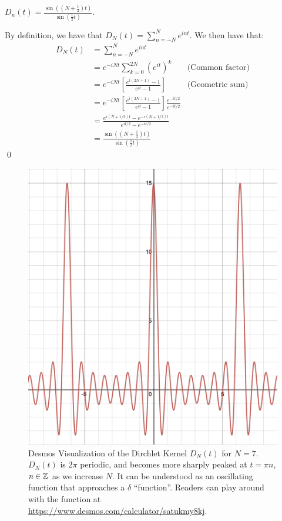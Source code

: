 \begin{nlemma}{ 1}{}
    $D_n(t) = \frac{\sin((N + \frac{1}{2})t)}{\sin(\frac{1}{2}t)}$.
\end{nlemma}

\begin{nproof}
    By definition, we have that $D_N(t) = \sum_{n=-N}^N e^{int}$. We then have that:
    \begin{align*}
        D_N(t) &= \sum_{n=-N}^N e^{int}
        \\ &= e^{-iNt}\sum_{k=0}^{2N}(e^{it})^k & \text{(Common factor)}
        \\ &= e^{-iNt}\left[\frac{e^{i(2N+1)} - 1}{e^{it} - 1}\right] & \text{(Geometric sum)}
        \\ &= e^{-iNt}\left[\frac{e^{i(2N+1)} - 1}{e^{it} - 1}\right]\frac{e^{-it/2}}{e^{-it/2}}
        \\ &= \frac{e^{i(N+1/2)t} - e^{-i(N+1/2)t}}{e^{it/2} - e^{-it/2}}
        \\ &= \frac{\sin((N + \frac{1}{2})t)}{\sin(\frac{1}{2}t)}
    \end{align*} \qed
\end{nproof}

\begin{figure}[htbp]
    \centering
    \includegraphics[scale=0.3]{Images/Dirchlet-graph.png}
    
    \caption{Desmos Visualization of the Dirchlet Kernel $D_N(t)$ for $N = 7$. $D_N(t)$ is $2\pi$ periodic, and becomes more sharply peaked at $t = \pi n$, $n \in \mathbb{Z}$ as we increase $N$. It can be understood as an oscillating function that approaches a $\delta$ ``function''. Readers can play around with the function at \url{https://www.desmos.com/calculator/satukmy8kj}.}
    \label{fig56}
\end{figure}

